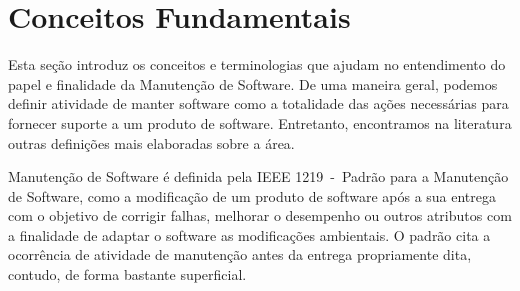 %
%
%
%
\section{Conceitos Fundamentais}
\label{sec:conceitos_basicos}

Esta seção introduz os conceitos e terminologias que ajudam no entendimento do
papel e finalidade da Manutenção de Software. De uma maneira geral, podemos definir
atividade de manter software como a totalidade das ações necessárias para
fornecer suporte a um produto de software. Entretanto, encontramos na literatura
outras definições mais elaboradas sobre a área.

Manutenção de Software é definida pela IEEE 1219~\cite{ISO-1219-1998}-~Padrão para a
Manutenção de Software, como a modificação de um produto de software após a sua
entrega com o objetivo de corrigir falhas, melhorar o desempenho ou outros
atributos com a finalidade de adaptar o software as modificações ambientais. O
padrão cita a ocorrência de atividade de manutenção antes da entrega
propriamente dita, contudo, de forma bastante superficial.

